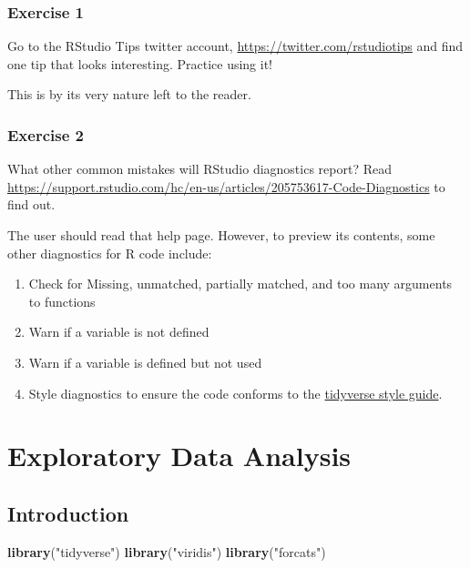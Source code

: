 \documentclass[]{book}
\newenvironment{Shaded}{\begin{snugshade}}{\end{snugshade}}
\newcommand{\KeywordTok}[1]{\textcolor[rgb]{0.13,0.29,0.53}{\textbf{#1}}}
\newcommand{\NormalTok}[1]{#1}
\newcommand{\StringTok}[1]{\textcolor[rgb]{0.31,0.60,0.02}{#1}}
\providecommand{\tightlist}{%
  \setlength{\itemsep}{0pt}\setlength{\parskip}{0pt}}
\theoremstyle{definition}
\theoremstyle{definition}
\theoremstyle{definition}
\theoremstyle{remark}
\begin{document}
\hypertarget{exercise-1-7}{%
\subsection{Exercise 1}\label{exercise-1-7}}

Go to the RStudio Tips twitter account,
\url{https://twitter.com/rstudiotips} and find one tip that looks
interesting. Practice using it!

This is by its very nature left to the reader.

\hypertarget{exercise-2-7}{%
\subsection{Exercise 2}\label{exercise-2-7}}

What other common mistakes will RStudio diagnostics report? Read
\url{https://support.rstudio.com/hc/en-us/articles/205753617-Code-Diagnostics}
to find out.

The user should read that help page. However, to preview its contents,
some other diagnostics for R code include:

\begin{enumerate}
\def\labelenumi{\arabic{enumi}.}
\tightlist
\item
  Check for Missing, unmatched, partially matched, and too many
  arguments to functions
\item
  Warn if a variable is not defined
\item
  Warn if a variable is defined but not used
\item
  Style diagnostics to ensure the code conforms to the
  \href{http://adv-r.had.co.nz/Style.html}{tidyverse style guide}.
\end{enumerate}

\hypertarget{exploratory-data-analysis}{%
\chapter{Exploratory Data Analysis}\label{exploratory-data-analysis}}

\hypertarget{introduction-3}{%
\section{Introduction}\label{introduction-3}}

\begin{Shaded}
\begin{Highlighting}[]
\KeywordTok{library}\NormalTok{(}\StringTok{"tidyverse"}\NormalTok{)}
\KeywordTok{library}\NormalTok{(}\StringTok{"viridis"}\NormalTok{)}
\KeywordTok{library}\NormalTok{(}\StringTok{"forcats"}\NormalTok{)}
\end{Highlighting}
\end{Shaded}
\end{document}
